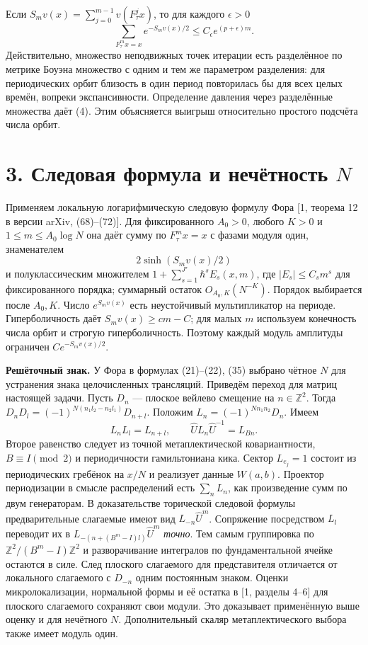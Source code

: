 \documentclass[11pt,a4paper]{article}
\newcommand{\Z}{\mathbb Z}
\newcommand{\sect}[1]{\section*{\sffamily\color{ink}#1}}
\newcommand{\subt}[1]{\par\medskip\noindent\textbf{#1.}\quad}
\begin{document}
Если $S_mv(x)=\sum_{j=0}^{m-1}v(F_\tau^jx)$, то для каждого $\epsilon>0$
\[
 \sum_{F_\tau^m x=x} e^{-S_mv(x)/2}\le C_\epsilon e^{(p+\epsilon)m}.      \tag{4}
\]
Действительно, множество неподвижных точек итерации есть разделённое по метрике Боуэна множество с одним и тем же параметром разделения: для периодических орбит близость в один период повторилась бы для всех целых времён, вопреки экспансивности. Определение давления через разделённые множества даёт (4). Этим объясняется выигрыш относительно простого подсчёта числа орбит.
\newpage
\sect{3. Следовая формула и нечётность $N$}
Применяем локальную логарифмическую следовую формулу Фора [1, теорема 12 в версии arXiv, (68)--(72)]. Для фиксированного $A_0>0$, любого $K>0$ и $1\le m\le A_0\log N$ она даёт сумму по $F_\tau^mx=x$ с фазами модуля один, знаменателем
\[
 2\sinh(S_mv(x)/2)
\]
и полуклассическим множителем $1+\sum_{s=1}^{J'}\hbar^s E_s(x,m)$, где $|E_s|\le C_s m^s$ для фиксированного порядка; суммарный остаток $O_{A_0,K}(N^{-K})$. Порядок выбирается после $A_0,K$. Число $e^{S_mv(x)}$ есть неустойчивый мультипликатор на периоде. Гиперболичность даёт $S_mv(x)\ge c m-C$; для малых $m$ используем конечность числа орбит и строгую гиперболичность. Поэтому каждый модуль амплитуды ограничен $C e^{-S_mv(x)/2}$.

\subt{Решёточный знак} У Фора в формулах (21)--(22), (35) выбрано чётное $N$ для устранения знака целочисленных трансляций. Приведём переход для матриц настоящей задачи. Пусть $D_n$ --- плоское вейлево смещение на $n\in\Z^2$. Тогда $D_nD_l=(-1)^{N(n_1l_2-n_2l_1)}D_{n+l}$. Положим $L_n=(-1)^{N n_1n_2}D_n$. Имеем
\[
 L_nL_l=L_{n+l},\qquad \widehat U L_n\widehat U^{-1}=L_{Bn}.
\]
Второе равенство следует из точной метаплектической ковариантности, $B\equiv I\pmod2$ и периодичности гамильтониана кика. Сектор $L_{e_j}=1$ состоит из периодических гребёнок на $x/N$ и реализует данные $W(a,b)$. Проектор периодизации в смысле распределений есть $\sum_n L_n$, как произведение сумм по двум генераторам. В доказательстве торической следовой формулы предварительные слагаемые имеют вид $L_{-n}\widehat U^m$. Сопряжение посредством $L_l$ переводит их в $L_{-(n+(B^m-I)l)}\widehat U^m$ \emph{точно}. Тем самым группировка по $\Z^2/(B^m-I)\Z^2$ и разворачивание интегралов по фундаментальной ячейке остаются в силе. След плоского слагаемого для представителя отличается от локального слагаемого с $D_{-n}$ одним постоянным знаком. Оценки микролокализации, нормальной формы и её остатка в [1, разделы 4--6] для плоского слагаемого сохраняют свои модули. Это доказывает применённую выше оценку и для нечётного $N$. Дополнительный скаляр метаплектического выбора также имеет модуль один.
\end{document}
